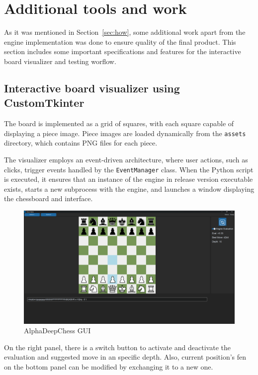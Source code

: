\section{Additional tools and work}
\label{sec:tools}

As it was mentioned in Section~\ref{sec:how}, some additional work apart from the engine implementation was done to ensure quality of the final product. This section includes some important specifications and features for the interactive board visualizer and testing worflow.

\subsection{Interactive board visualizer using CustomTkinter}

The board is implemented as a grid of squares, with each square capable of displaying a piece image. Piece images are loaded dynamically from the \texttt{assets} directory, which contains PNG files for each piece.

\vspace{1em}

\noindent The visualizer employs an event-driven architecture, where user actions, such as clicks, trigger events handled by the \texttt{EventManager} class. When the Python script is executed, it ensures that an instance of the engine in release version executable exists, starts a new subprocess with the engine, and launches a window displaying the chessboard and interface.

\begin{figure}[H]
    \centering
    \includegraphics[width=\textwidth]{Imagenes/gui.png}
    \caption{AlphaDeepChess GUI}
    \label{fig:gui}
\end{figure}

On the right panel, there is a switch button to activate and deactivate the evaluation and suggested move in an specific depth. Also, current position's fen on the bottom panel can be modified by exchanging it to a new one.

